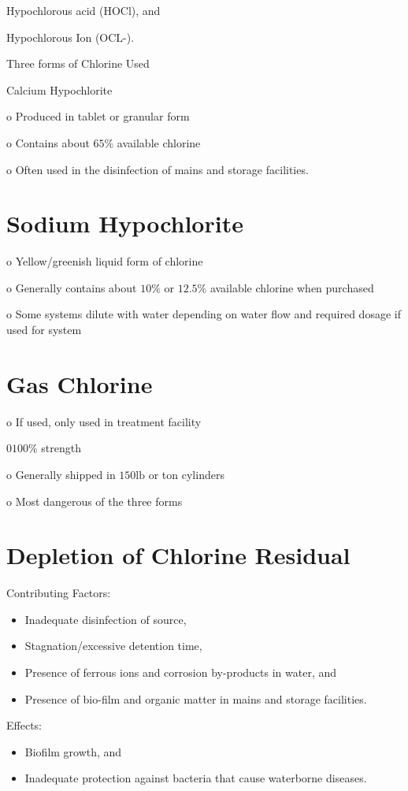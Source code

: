 \documentclass[10pt]{article}
\begin{document}
Hypochlorous acid (HOCl), and

Hypochlorous Ion (OCL-).

Three forms of Chlorine Used

Calcium Hypochlorite

o Produced in tablet or granular form

o Contains about $65 \%$ available chlorine

o Often used in the disinfection of mains and storage facilities.

\section{Sodium Hypochlorite}
o Yellow/greenish liquid form of chlorine

o Generally contains about $10 \%$ or $12.5 \%$ available chlorine when purchased

o Some systems dilute with water depending on water flow and required dosage if used for system

\section{Gas Chlorine}
o If used, only used in treatment facility

$0100 \%$ strength

o Generally shipped in $150 \mathrm{lb}$ or ton cylinders

o Most dangerous of the three forms

\section{Depletion of Chlorine Residual}
Contributing Factors:

\begin{itemize}
  \item Inadequate disinfection of source,

  \item Stagnation/excessive detention time,

  \item Presence of ferrous ions and corrosion by-products in water, and

  \item Presence of bio-film and organic matter in mains and storage facilities.

\end{itemize}
Effects:

\begin{itemize}
  \item Biofilm growth, and

  \item Inadequate protection against bacteria that cause waterborne diseases.

\end{itemize}
\end{document}
